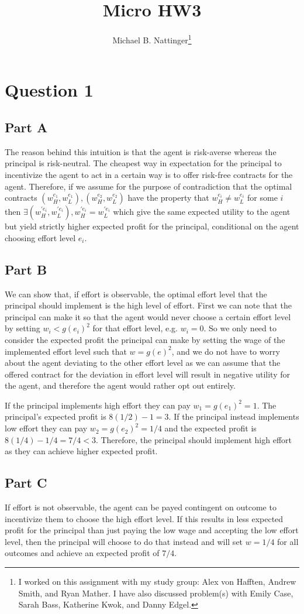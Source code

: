 \documentclass[11pt]{article} %
\title{Micro HW3}
\author{Michael B. Nattinger\footnote{I worked on this assignment with my study group: Alex von Hafften, Andrew Smith, and Ryan Mather. I have also discussed problem(s) with Emily Case, Sarah Bass, Katherine Kwok, and Danny Edgel.}}
\begin{document}
\maketitle

\section{Question 1}
\subsection{Part A}
The reason behind this intuition is that the agent is risk-averse whereas the principal is risk-neutral. The cheapest way in expectation for the principal to incentivize the agent to act in a certain way is to offer risk-free contracts for the agent. Therefore, if we assume for the purpose of contradiction that the optimal contracts $(w_H^{e_1},w_L^{e_1}),(w_H^{e_2},w_L^{e_2})$ have the property that $w_H^{e_i} \neq w_L^{e_i} $ for some $i$ then $\exists (w_H^{'e_i},w_L^{'e_i}), w_H^{'e_i}=w_L^{'e_i}$ which give the same expected utility to the agent but yield strictly higher expected profit for the principal, conditional on the agent choosing effort level $e_i$.
\subsection{Part B}
We can show that, if effort is observable, the optimal effort level that the principal should implement is the high level of effort. First we can note that the principal can make it so that the agent would never choose a certain effort level by setting $w_i<g(e_i)^2$ for that effort level, e.g. $w_i = 0$. So we only need to consider the expected profit the principal can make by setting the wage of the implemented effort level such that $w = g(e)^2$, and we do not have to worry about the agent deviating to the other effort level as we can assume that the offered contract for the deviation in effort level will result in negative utility for the agent, and therefore the agent would rather opt out entirely.

If the principal implements high effort they can pay $w_1 = g(e_1)^2 = 1.$ The principal's expected profit is $8(1/2) - 1 = 3.$ If the principal instead implements low effort they can pay $w_2 = g(e_2)^2 = 1/4 $ and the expected profit is $8(1/4) - 1/4 = 7/4<3$. Therefore, the principal should implement high effort as they can achieve higher expected profit.

\subsection{Part C}
If effort is not observable, the agent can be payed contingent on outcome to incentivize them to choose the high effort level. If this results in less expected profit for the principal than just paying the low wage and accepting the low effort level, then the principal will choose to do that instead and will set $w = 1/4$ for all outcomes and achieve an expected profit of $7/4$. 
\end{document}
